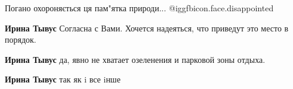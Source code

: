 
 
 
 
 


Погано охороняється ця пам"ятка природи...  @igg{fbicon.face.disappointed} 

\textbf{Ирина Тывус} Согласна с Вами. Хочется надеяться, что приведут это место в порядок.

\textbf{Ирина Тывус} да, явно не хватает озеленения и парковой зоны отдыха.

\textbf{Ирина Тывус} так як i все iнше
